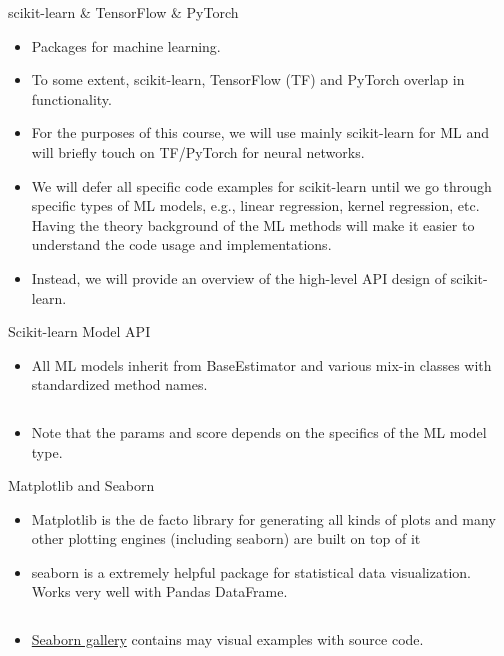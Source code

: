 \documentclass[aspectratio=169]{beamer}
\begin{document}
    \begin{frame}{scikit-learn \& TensorFlow \& PyTorch}
        \begin{itemize}
            \item Packages for machine learning.
            \item To some extent, scikit-learn, TensorFlow (TF) and PyTorch overlap in functionality.
            \item For the purposes of this course, we will use mainly scikit-learn for ML and will briefly touch on TF/PyTorch for neural networks.
            \item We will defer all specific code examples for scikit-learn until we go through specific types of ML models, e.g., linear regression, kernel regression, etc. Having the theory background of the ML methods will make it easier to understand the code usage and implementations.
            \item Instead, we will provide an overview of the high-level API design of scikit-learn.
        \end{itemize}
    \end{frame}


    \begin{frame}[fragile]{Scikit-learn Model API}
        \begin{itemize}
            \item All ML models inherit from BaseEstimator and various mix-in classes with standardized method names.
            \inputminted{python}{example_sklearn.py}
            \item Note that the params and score depends on the specifics of the ML model type.
        \end{itemize}
    \end{frame}



    \begin{frame}[fragile]{Matplotlib and Seaborn}
        \begin{itemize}
            \item Matplotlib is the de facto library for generating all kinds of plots and many other plotting engines (including seaborn) are built on top of it
            \item seaborn is a extremely helpful package for statistical data visualization. Works very well with Pandas DataFrame.
            \inputminted{python}{example_plotting.py}
            \item \href{http://seaborn.pydata.org/examples/index.html}{Seaborn gallery} contains may visual examples with source code.
        \end{itemize}
    \end{frame}
\end{document}

